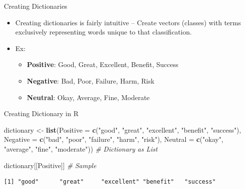 \documentclass[
  ignorenonframetext,
  aspectratio=169]{beamer}
\newenvironment{Shaded}{\begin{snugshade}}{\end{snugshade}}
\newcommand{\AttributeTok}[1]{\textcolor[rgb]{0.13,0.29,0.53}{#1}}
\newcommand{\CommentTok}[1]{\textcolor[rgb]{0.56,0.35,0.01}{\textit{#1}}}
\newcommand{\FunctionTok}[1]{\textcolor[rgb]{0.13,0.29,0.53}{\textbf{#1}}}
\newcommand{\NormalTok}[1]{#1}
\newcommand{\OtherTok}[1]{\textcolor[rgb]{0.56,0.35,0.01}{#1}}
\newcommand{\StringTok}[1]{\textcolor[rgb]{0.31,0.60,0.02}{#1}}
\begin{document}
\begin{frame}{Creating Dictionaries}
\label{creating-dictionaries}
\begin{itemize}
\item Creating dictionaries is fairly intuitive -- Create vectors (classes) with terms exclusively representing words unique to that classification. \par \vspace{2.5mm}
\item Ex: 
  \begin{itemize}
  \item \textbf{Positive}: Good, Great, Excellent, Benefit, Success
  \item \textbf{Negative}: Bad, Poor, Failure, Harm, Risk
  \item \textbf{Neutral}: Okay, Average, Fine, Moderate
  \end{itemize}
\end{itemize}
\end{frame}

\begin{frame}[fragile]{Creating Dictionary in R}
\label{creating-dictionary-in-r}
\scriptsize

\begin{Shaded}
\begin{Highlighting}[]
\NormalTok{dictionary }\OtherTok{\textless{}{-}} \FunctionTok{list}\NormalTok{(}\AttributeTok{Positive =} \FunctionTok{c}\NormalTok{(}\StringTok{"good"}\NormalTok{, }\StringTok{"great"}\NormalTok{, }\StringTok{"excellent"}\NormalTok{, }\StringTok{"benefit"}\NormalTok{, }\StringTok{"success"}\NormalTok{),}
                   \AttributeTok{Negative =} \FunctionTok{c}\NormalTok{(}\StringTok{"bad"}\NormalTok{, }\StringTok{"poor"}\NormalTok{, }\StringTok{"failure"}\NormalTok{, }\StringTok{"harm"}\NormalTok{, }\StringTok{"risk"}\NormalTok{),}
                   \AttributeTok{Neutral  =} \FunctionTok{c}\NormalTok{(}\StringTok{"okay"}\NormalTok{, }\StringTok{"average"}\NormalTok{, }\StringTok{"fine"}\NormalTok{, }\StringTok{"moderate"}\NormalTok{)) }\CommentTok{\# Dictionary as List}

\NormalTok{dictionary[[}\StringTok{\textquotesingle{}Positive\textquotesingle{}}\NormalTok{]] }\CommentTok{\# Sample}
\end{Highlighting}
\end{Shaded}

\begin{verbatim}
[1] "good"      "great"     "excellent" "benefit"   "success"  
\end{verbatim}
\end{frame}
\end{document}
